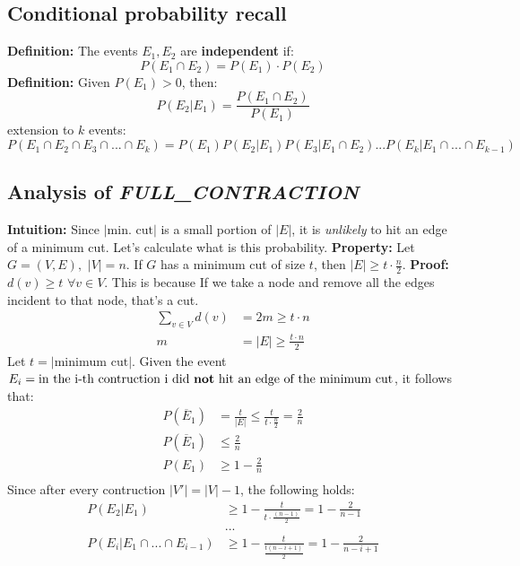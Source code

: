 \subsection{Conditional probability recall}
\textbf{Definition:} The events $E_1, E_2$ are \textbf{independent} if:
\[P(E_1 \cap E_2) = P(E_1) \cdot P(E_2)\]
\textbf{Definition:} Given $P(E_1) > 0$, then:
\[P(E_2 | E_1) = \frac{P(E_1 \cap E_2)}{P(E_1)}\]
extension to $k$ events:
\[P(E_1 \cap E_2 \cap E_3 \cap ... \cap E_k) = P(E_1)P(E_2 | E_1)P(E_3 | E_1 \cap E_2) ... P(E_k | E_1 \cap ... \cap E_{k-1})\]

\subsection{Analysis of \textit{FULL\_CONTRACTION}}
\textbf{Intuition:} Since $|\text{min. cut}|$ is a small portion of $|E|$, it is \textit{unlikely} to hit an edge of a minimum cut. Let's calculate what is this probability.\newline\newline
\textbf{Property:} Let $G=(V, E), \,\, |V| = n$. If $G$ has a minimum cut of size $t$, then $|E| \geq t \cdot \frac{n}{2}$.\newline\newline
\textbf{Proof:} $d(v) \geq t \,\, \forall v \in V$. This is because If we take a node and remove all the edges incident to that node, that's a cut.
\[
    \begin{split}
        \sum_{v \in V}d(v) & = 2m \geq t \cdot n\\
        m & = |E| \geq \frac{t \cdot n}{2}
    \end{split}
\]
Let $t = |\text{minimum cut}|$. Given the event $E_i = \text{in the i-th contruction i did \textbf{not} hit an edge of the minimum cut}$, it follows that:
\[
    \begin{split}
        P(\overline{E}_1) & = \frac{t}{|E|} \leq \frac{t}{t \cdot \frac{n}{2}} = \frac{2}{n}\\
        P(\overline{E}_1) & \leq \frac{2}{n}\\
        P(E_1) & \geq 1 - \frac{2}{n}\\
    \end{split}
\]
Since after every contruction $|V'| = |V| - 1$, the following holds:
\[
    \begin{split}
        P(E_2 | E_1) & \geq 1 - \frac{t}{t \cdot \frac{(n - 1)}{2}} = 1 - \frac{2}{n - 1}\\
        & ... \\
        P(E_i | E_1 \cap ... \cap E_{i-1}) & \geq 1 - \frac{t}{\frac{t(n- i + 1)}{2}} = 1 - \frac{2}{n - i + 1}
    \end{split}
\]
